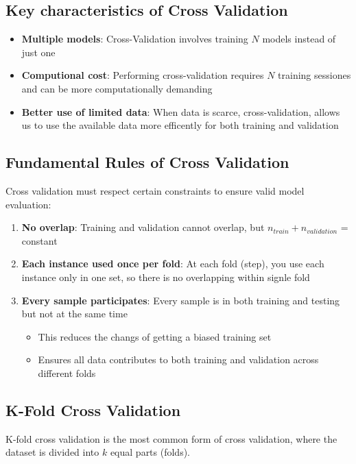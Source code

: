 \documentclass[a4paper]{article}
\theoremstyle{definition}
\begin{document}
\subsection{Key characteristics of Cross Validation}
\begin{itemize}
    \item \textbf{Multiple models}: Cross-Validation involves training \( N \) models instead of just one 
    \item \textbf{Computional cost}: Performing cross-validation requires \( N \) training sessiones and can be more computationally demanding 
    \item \textbf{Better use of limited data}: When data is scarce, cross-validation, allows us to use the available data more efficently for both training and validation
\end{itemize}
\subsection{Fundamental Rules of Cross Validation}
Cross validation must respect certain constraints to ensure valid model evaluation:
\begin{enumerate}
    \item \textbf{No overlap}: Training and validation cannot overlap, but \( n_{train} + n_{validation} \) = constant 
    \item \textbf{Each instance used once per fold}: At each fold (step), you use each instance only in one set, so there is no overlapping within signle fold 
    \item \textbf{Every sample participates}: Every sample is in both training and testing but not at the same time 
    \begin{itemize}
        \item This reduces the changs of getting a biased training set 
        \item Ensures all data contributes to both training and validation across different folds
    \end{itemize}
\end{enumerate}
\subsection{K-Fold Cross Validation}
K-fold cross validation is the most common form of cross validation, where the dataset is divided into \( k \) equal parts (folds).
\end{document}
